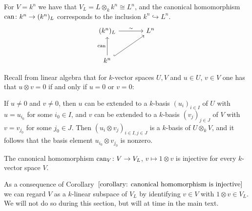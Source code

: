\begin{example}
  \label{example: extension of scalars for kn}
  For $V = k^n$ we have that $V_L = L \otimes_k k^n \cong L^n$, and the canonical homomorphism $\operatorname{can} \colon k^n \to (k^n)_L$ corresponds to the inclusion $k^n \hookrightarrow L^n$.
  \[
    \begin{tikzcd}[sep = large]
        (k^n)_L
        \arrow{r}[above]{\sim}
      & L^n
      \\
        k^n
        \arrow{u}[left]{\can}
        \arrow[hookrightarrow]{ur}
      & {}
    \end{tikzcd}
  \]
\end{example}


\begin{recall}
  Recall from linear algebra that for $k$-vector spaces $U, V$ and $u \in U$, $v \in V$ one has that $u \otimes v = 0$ if and only if $u = 0$ or $v = 0$:
  
  If $u \neq 0$ and $v \neq 0$, then $u$ can be extended to a $k$-basis $(u_i)_{i \in I}$ of $U$ with $u = u_{i_0}$ for some $i_0 \in I$, and $v$ can be extended to a $k$-basis $(v_j)_{j \in J}$ of $V$ with $v = v_{j_0}$ for some $j_0 \in J$.
  Then $(u_i \otimes v_j)_{i \in I, j \in J}$ is a $k$-basis of $U \otimes_k V$, and it follows that the basis element $u_{i_0} \otimes v_{j_0}$ is nonzero.
\end{recall}


\begin{corollary}
  \label{corollary: canonical homomorphism is injective}
  The canonical homomorphism $\operatorname{can}_V \colon V \to V_L$, $v \mapsto 1 \otimes v$ is injective for every $k$-vector space $V$.
\end{corollary}


\begin{fluff}
  As a consequence of Corollary~$\ref{corollary: canonical homomorphism is injective}$ we can regard $V$ as a $k$-linear subspace of $V_L$ by identifying $v \in V$ with $1 \otimes v \in V_L$.
  We will not do so during this section, but will at time in the main text.
\end{fluff}


